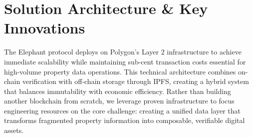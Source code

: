 \chapter{Solution Architecture \& Key Innovations}

The Elephant protocol deploys on Polygon's Layer 2 infrastructure to achieve immediate scalability while maintaining sub-cent transaction costs essential for high-volume property data operations. This technical architecture combines on-chain verification with off-chain storage through IPFS, creating a hybrid system that balances immutability with economic efficiency. Rather than building another blockchain from scratch, we leverage proven infrastructure to focus engineering resources on the core challenge: creating a unified data layer that transforms fragmented property information into composable, verifiable digital assets.

